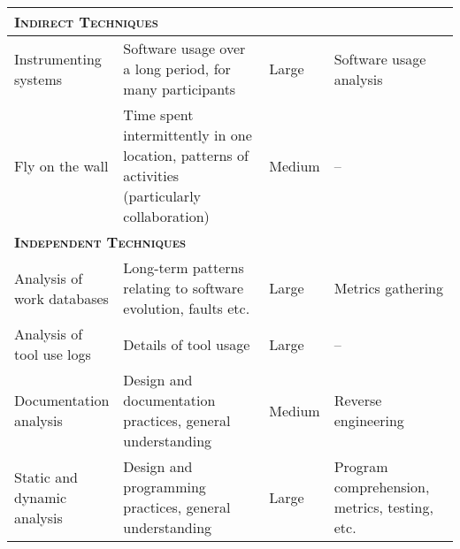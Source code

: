 {\begin{landscape}
\begin{table}
{\begin{tabular}{p{0.2\linewidth}|p{0.375\linewidth}p{0.125\linewidth}p{0.3\linewidth}}
\midrule
\multicolumn{4}{l}{\textsc{\textbf{Indirect Techniques}}}\\
\midrule

Instrumenting systems &
Software usage over a long period, for many participants &
Large &
Software usage analysis \\

Fly on the wall &
Time spent intermittently in one location, patterns of activities (particularly collaboration) &
Medium &
-- \\

\midrule
\multicolumn{4}{l}{\textsc{\textbf{Independent Techniques}}}\\
\midrule

Analysis of work databases &
Long-term patterns relating to software evolution, faults etc. &
Large &
Metrics gathering \\

Analysis of tool use logs &
Details of tool usage &
Large &
-- \\

Documentation analysis &
Design and documentation practices, general understanding &
Medium &
Reverse engineering \\

Static and dynamic analysis &
Design and programming practices, general understanding &
Large &
Program comprehension, metrics, testing, etc. \\

\bottomrule

\end{tabular}}
\end{table}\end{landscape}}